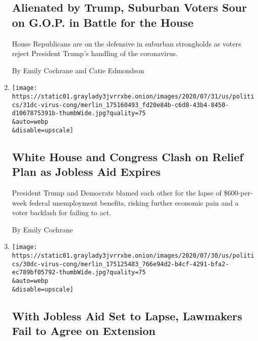 \begin{enumerate}
  \hypertarget{alienated-by-trump-suburban-voters-sour-on-gop-in-battle-for-the-house}{%
  \subsection{Alienated by Trump, Suburban Voters Sour on G.O.P. in
  Battle for the
  House}\label{alienated-by-trump-suburban-voters-sour-on-gop-in-battle-for-the-house}}

  House Republicans are on the defensive in suburban strongholds as
  voters reject President Trump's handling of the coronavirus.

  By Emily Cochrane and Catie Edmondson
\item
  \href{/2020/07/31/us/politics/white-house-congress-relief-plan-jobless-aid.html}{}

  \texttt{[image: https://static01.graylady3jvrrxbe.onion/images/2020/07/31/us/politics/31dc-virus-cong/merlin\_175160493\_fd20e84b-c6d8-43b4-8450-d1067875391b-thumbWide.jpg?quality=75\\\&auto=webp\\\&disable=upscale]}

  \hypertarget{white-house-and-congress-clash-on-relief-plan-as-jobless-aid-expires}{%
  \subsection{White House and Congress Clash on Relief Plan as Jobless
  Aid
  Expires}\label{white-house-and-congress-clash-on-relief-plan-as-jobless-aid-expires}}

  President Trump and Democrats blamed each other for the lapse of
  \$600-per-week federal unemployment benefits, risking further economic
  pain and a voter backlash for failing to act.

  By Emily Cochrane
\item
  \href{/2020/07/30/us/politics/senate-virus-aid.html}{}

  \texttt{[image: https://static01.graylady3jvrrxbe.onion/images/2020/07/30/us/politics/30dc-virus-cong/merlin\_175125483\_766e94d2-b4cf-4291-bfa2-ec789bf05792-thumbWide.jpg?quality=75\\\&auto=webp\\\&disable=upscale]}

  \hypertarget{with-jobless-aid-set-to-lapse-lawmakers-fail-to-agree-on-extension}{%
  \subsection{With Jobless Aid Set to Lapse, Lawmakers Fail to Agree on
  Extension}\label{with-jobless-aid-set-to-lapse-lawmakers-fail-to-agree-on-extension}}


\end{enumerate}
